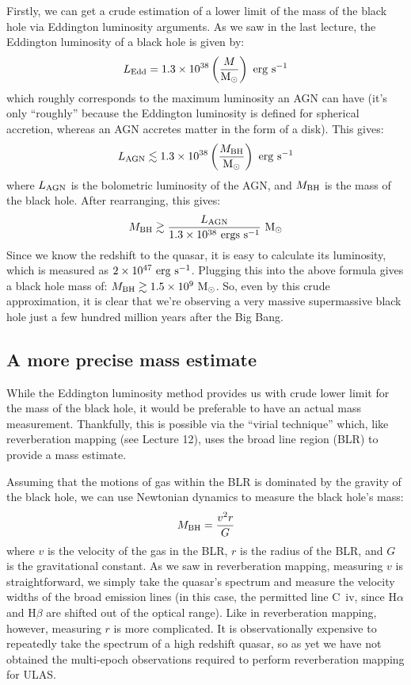 \documentclass[11pt]{article}
\begin{document}
Firstly, we can get a crude estimation of a lower limit of the mass of
the black hole via Eddington luminosity arguments. As we saw in the
last lecture, the Eddington luminosity of a black hole is given by:
\begin{equation}
L_{\rm Edd} = 1.3\times10^{38}\left(\frac{M}{\rm M_\odot}\right)~{\rm erg~s^{-1}}
\end{equation}
which roughly corresponds to the maximum luminosity an AGN can have
(it's only ``roughly'' because the Eddington luminosity is defined for
spherical accretion, whereas an AGN accretes matter in the form of a
disk). This gives:
\begin{equation}
L_{\rm AGN} \lesssim 1.3\times10^{38}\left(\frac{M_{\rm BH}}{\rm M_\odot}\right)~{\rm erg~s^{-1}}
\end{equation}
where $L_{\rm AGN}$ is the bolometric luminosity of the AGN, and
$M_{\rm BH}$ is the mass of the black hole. After rearranging, this
gives:
\begin{equation}
M_{\rm BH} \gtrsim \frac{L_{\rm AGN}}{1.3\times10^{38}~{\rm
    ergs~s^{-1}}}~{\rm M_\odot}
\end{equation}
Since we know the redshift to the quasar, it is easy to calculate its
luminosity, which is measured as $2\times10^{47}~{\rm
  erg~s^{-1}}$. Plugging this into the above formula gives a black
hole mass of: $M_{\rm BH}\gtrsim1.5\times10^9~{\rm M_\odot}$. So, even
by this crude approximation, it is clear that we're observing a very
massive supermassive black hole just a few hundred million years after
the Big Bang.

\subsection{A more precise mass estimate}
While the Eddington luminosity method provides us with crude lower
limit for the mass of the black hole, it would be preferable to have
an actual mass measurement. Thankfully, this is possible via the
``virial technique'' which, like reverberation mapping (see Lecture
12), uses the broad line region (BLR) to provide a mass estimate.

Assuming that the motions of gas within the BLR is dominated by the
gravity of the black hole, we can use Newtonian dynamics to measure
the black hole's mass:
\begin{equation}
M_{\rm BH}=\frac{v^2r}{G}
\end{equation}
where $v$ is the velocity of the gas in the BLR, $r$ is the radius of
the BLR, and $G$ is the gravitational constant. As we saw in
reverberation mapping, measuring $v$ is straightforward, we simply
take the quasar's spectrum and measure the velocity widths of the
broad emission lines (in this case, the permitted line C~{\sc iv},
since H$\alpha$ and H$\beta$ are shifted out of the optical
range). Like in reverberation mapping, however, measuring $r$ is more
complicated. It is observationally expensive to repeatedly take the
spectrum of a high redshift quasar, so as yet we have not obtained
the multi-epoch observations required to perform reverberation
mapping for ULAS.
\end{document}
